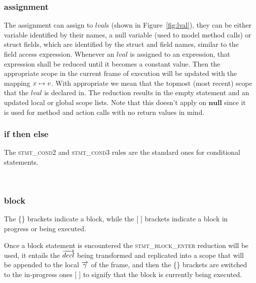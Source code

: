 \documentclass[UTF8]{article}
\begin{document}


\subsubsection*{assignment}
The assignment can assign to $lval$s (shown in Figure~\ref{fig:lval}), they can be either variable identified by their names, a null variable (used to model method calls) or struct fields, which are identified by the struct and field names, similar to the field access expression. Whenever an $lval$ is assigned to an expression, that expression shall be reduced until it becomes a constant value. Then the appropriate scope in the current frame of execution will be updated with the mapping  $x \mapsto v$. With appropriate we mean that the topmost (most recent) scope that the $lval$ is declared in. The reduction results in the empty statement and an updated local or global scope lists. Note that this doesn't apply on $\mathbf{null}$ since it is used for method and action calls with no return values in mind.

\begin{figure}[ht!]
    \ottusedrule{\ottdrulestmtXXassXXv{}}
\end{figure}


\subsubsection*{if then else}
The \textsc{stmt\_cond2} and \textsc{stmt\_cond3} rules are the standard ones for conditional statements.

\begin{figure}[ht!]
    \ottusedrule{\ottdrulestmtXXcondTwo{}} \\
    \ottusedrule{\ottdrulestmtXXcondThree{}} 
\end{figure}


\subsubsection*{block}
The \{\} brackets indicate a block, while the [ ] brackets indicate a block in progress or being executed.

Once a block statement is encountered the \textsc{stmt\_block\_enter} reduction will be used, it entails the $\overrightarrow{decl}{}$ being transformed and replicated into a scope that will be appended to the local $\overrightarrow{\gamma}{}$ of the frame, and then the \{\} brackets are switched to the in-progress ones [ ] to signify that the block is currently being executed. 
\end{document}
